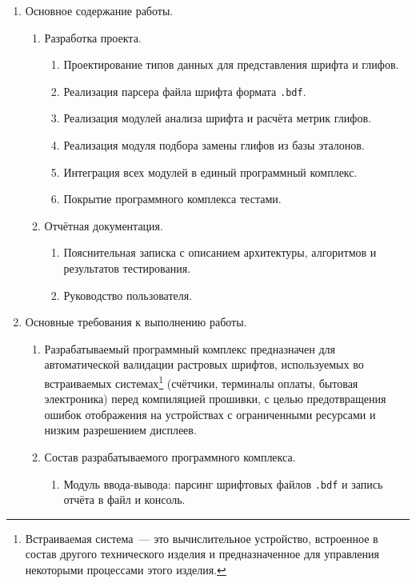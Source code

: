 \begin{enumerate}
\begin{enumerate}[label=\alph*.]
        \end{enumerate}
    \item Основное содержание работы.
    \begin{enumerate}[label=\alph*.]
        \item Разработка проекта.
        \begin{enumerate}
            \item Проектирование типов данных для представления шрифта и глифов.
            \item Реализация парсера файла шрифта формата \verb|.bdf|.
            \item Реализация модулей анализа шрифта и расчёта метрик глифов.
            \item Реализация модуля подбора замены глифов из базы эталонов.
            \item Интеграция всех модулей в единый программный комплекс.
            \item Покрытие программного комплекса тестами.
        \end{enumerate}
        \item Отчётная документация.
        \begin{enumerate}
            \item Пояснительная записка с описанием архитектуры, алгоритмов и результатов тестирования.
            \item Руководство пользователя.
        \end{enumerate}
    \end{enumerate}
    \item Основные требования к выполнению работы.
    \begin{enumerate}[label=\alph*.]
        \item Разрабатываемый программный комплекс предназначен для автоматической валидации растровых шрифтов, используемых во встраиваемых системах\footnote{Встраиваемая система~--- это вычислительное устройство, встроенное в состав другого технического изделия и предназначенное для управления некоторыми процессами этого изделия.} (счётчики, терминалы оплаты, бытовая электроника) перед компиляцией прошивки, с целью предотвращения ошибок отображения на устройствах с ограниченными ресурсами и низким разрешением дисплеев.
        \item Состав разрабатываемого программного комплекса.
        \begin{enumerate}
            \item Модуль ввода-вывода: парсинг шрифтовых файлов \verb|.bdf| и запись отчёта в файл и консоль.

\end{enumerate}
\end{enumerate}
\end{enumerate}
